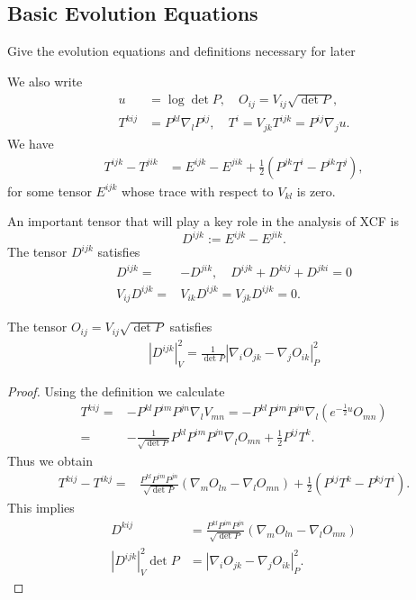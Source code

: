 \documentclass[a4paper, 12pt]{amsart}
\begin{document}
\subsection{Basic Evolution Equations}
\label{subsec:xcf_evolution}

{\color{red} Give the evolution equations and definitions necessary for later}

We also write
\begin{align}
 u&=\log\det P,\quad
O_{ij}=V_{ij}\sqrt{\det P},\\
T^{kij}&=P^{kl}\nabla_l P^{ij},\quad T^i=V_{jk}T^{ijk}=P^{ij}\nabla_ju.
\end{align}
We have
\begin{align}
    T^{ijk}-T^{jik}&=E^{ijk}-E^{jik}+\frac{1}{2}\left(P^{jk}T^i-P^{ik}T^j\right),
\end{align}
for some tensor $E^{ijk}$ whose trace with respect to $V_{kl}$ is zero.

An important tensor that will play a key role in the analysis of XCF is
\[D^{ijk}:=E^{ijk}-E^{jik}.\]
The tensor $D^{ijk}$ satisfies
\begin{align}
D^{ijk}=&-D^{jik},\quad D^{ijk}+D^{kij}+D^{jki}=0\\
V_{ij}D^{ijk}=&V_{ik}D^{ijk}=V_{jk}D^{ijk}=0.
\end{align}

\begin{lemma}
\label{lem:cubicform_codazzi}

The tensor $O_{ij}=V_{ij}\sqrt{\det P}$ satisfies
\begin{align}
|D^{ijk}|_V^2=\frac{1}{\det P}|\nabla_iO_{jk}-\nabla_jO_{ik}|_P^2
\end{align}
\end{lemma}

\begin{proof}
Using the definition we calculate
\begin{align}
T^{kij}=&-P^{kl}P^{im}P^{jn}\nabla_l V_{mn}=-P^{kl}P^{im}P^{jn}\nabla_l (e^{-\frac{1}{2}u}O_{mn})\\
=&-\frac{1}{\sqrt{\det P}}P^{kl}P^{im}P^{jn}\nabla_l O_{mn}+\frac{1}{2}P^{ij}T^k.
\end{align}
Thus we obtain
\begin{align*}
T^{kij}-T^{ikj}=&\frac{P^{kl}P^{im}P^{jn}}{\sqrt{\det P}}\left(\nabla_m O_{ln}-\nabla_l O_{mn}\right)+\frac{1}{2}(P^{ij}T^k-P^{kj}T^i).
\end{align*}
This implies
\begin{align}
D^{kij}&=\frac{P^{kl}P^{im}P^{jn}}{\sqrt{\det P}}\left(\nabla_m O_{ln}-\nabla_l O_{mn}\right)\\
|D^{ijk}|_V^2\det P&=|\nabla_iO_{jk}-\nabla_jO_{ik}|_P^2.
\end{align}
\end{proof}
\end{document}
